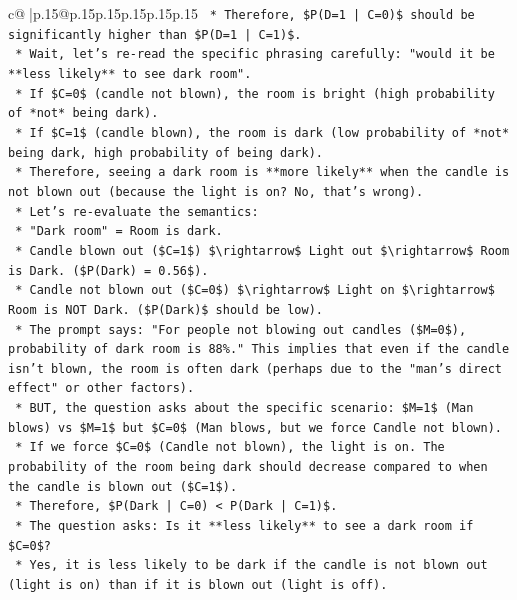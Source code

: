 \documentclass{article}
\begin{document}
{\begin{supertabular}{c@{$\;$}|p{.15\linewidth}@{}p{.15\linewidth}p{.15\linewidth}p{.15\linewidth}p{.15\linewidth}p{.15\linewidth}}
{{{\texttt{        *   Therefore, \$P(D=1 | C=0)\$ should be significantly higher than \$P(D=1 | C=1)\$.} \\
\texttt{        *   Wait, let's re{-}read the specific phrasing carefully: "would it be **less likely** to see dark room".} \\
\texttt{        *   If \$C=0\$ (candle not blown), the room is bright (high probability of *not* being dark).} \\
\texttt{        *   If \$C=1\$ (candle blown), the room is dark (low probability of *not* being dark, high probability of being dark).} \\
\texttt{        *   Therefore, seeing a dark room is **more likely** when the candle is not blown out (because the light is on? No, that's wrong).} \\
\texttt{        *   Let's re{-}evaluate the semantics:} \\
\texttt{            *   "Dark room" = Room is dark.} \\
\texttt{            *   Candle blown out (\$C=1\$) \$\textbackslash{}rightarrow\$ Light out \$\textbackslash{}rightarrow\$ Room is Dark. (\$P(Dark) = 0.56\$).} \\
\texttt{            *   Candle not blown out (\$C=0\$) \$\textbackslash{}rightarrow\$ Light on \$\textbackslash{}rightarrow\$ Room is NOT Dark. (\$P(Dark)\$ should be low).} \\
\texttt{            *   The prompt says: "For people not blowing out candles (\$M=0\$), probability of dark room is 88\%." This implies that even if the candle isn't blown, the room is often dark (perhaps due to the "man's direct effect" or other factors).} \\
\texttt{            *   BUT, the question asks about the specific scenario: \$M=1\$ (Man blows) vs \$M=1\$ but \$C=0\$ (Man blows, but we force Candle not blown).} \\
\texttt{            *   If we force \$C=0\$ (Candle not blown), the light is on. The probability of the room being dark should decrease compared to when the candle is blown out (\$C=1\$).} \\
\texttt{            *   Therefore, \$P(Dark | C=0) < P(Dark | C=1)\$.} \\
\texttt{            *   The question asks: Is it **less likely** to see a dark room if \$C=0\$?} \\
\texttt{            *   Yes, it is less likely to be dark if the candle is not blown out (light is on) than if it is blown out (light is off).} \\
}}}
\end{supertabular}}
\end{document}
